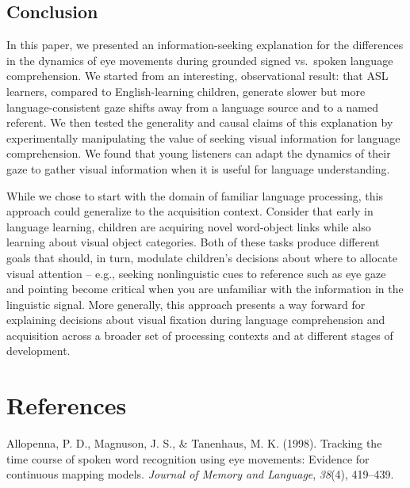 \documentclass[,man,floatsintext]{apa6}
\begin{document}
\hypertarget{conclusion}{%
\subsection{Conclusion}\label{conclusion}}

In this paper, we presented an information-seeking explanation for the
differences in the dynamics of eye movements during grounded signed
vs.~spoken language comprehension. We started from an interesting,
observational result: that ASL learners, compared to English-learning
children, generate slower but more language-consistent gaze shifts away
from a language source and to a named referent. We then tested the
generality and causal claims of this explanation by experimentally
manipulating the value of seeking visual information for language
comprehension. We found that young listeners can adapt the dynamics of
their gaze to gather visual information when it is useful for language
understanding.

While we chose to start with the domain of familiar language processing,
this approach could generalize to the acquisition context. Consider that
early in language learning, children are acquiring novel word-object
links while also learning about visual object categories. Both of these
tasks produce different goals that should, in turn, modulate children's
decisions about where to allocate visual attention -- e.g., seeking
nonlinguistic cues to reference such as eye gaze and pointing become
critical when you are unfamiliar with the information in the linguistic
signal. More generally, this approach presents a way forward for
explaining decisions about visual fixation during language comprehension
and acquisition across a broader set of processing contexts and at
different stages of development.

\newpage

\hypertarget{references}{%
\section{References}\label{references}}

\setlength{\parindent}{-0.5in}
\setlength{\leftskip}{0.5in}

\hypertarget{refs}{}
\leavevmode\hypertarget{ref-allopenna1998tracking}{}%
Allopenna, P. D., Magnuson, J. S., \& Tanenhaus, M. K. (1998). Tracking
the time course of spoken word recognition using eye movements: Evidence
for continuous mapping models. \emph{Journal of Memory and Language},
\emph{38}(4), 419--439.
\end{document}

